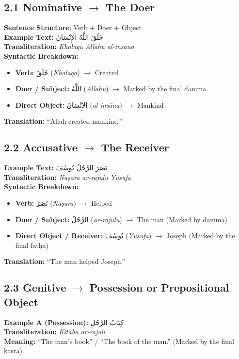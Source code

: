 \documentclass[11pt,a4paper]{article}
\begin{document}
\subsection{2.1 Nominative $\rightarrow$ The Doer}
\textbf{Sentence Structure:} Verb + Doer + Object \\
\textbf{Example Text:} \hfill {\Large \textarabic{خَلَقَ اللَّهُ الإِنْسَانَ}} \\
\textbf{Transliteration:} \textit{Khalaqa Allāhu al-insāna} \\
\textbf{Syntactic Breakdown:}
\begin{itemize}
    \item \textbf{Verb:} \textarabic{خَلَقَ} (\textit{Khalaqa}) $\rightarrow$ Created
    \item \textbf{Doer / Subject:} \textarabic{اللَّهُ} (\textit{Allāhu}) $\rightarrow$ Marked by the final ḍamma
    \item \textbf{Direct Object:} \textarabic{الإِنْسَانَ} (\textit{al-insāna}) $\rightarrow$ Mankind
\end{itemize}
\textbf{Translation:} ``Allah created mankind.''

\subsection{2.2 Accusative $\rightarrow$ The Receiver}
\textbf{Example Text:} \hfill {\Large \textarabic{نَصَرَ الرَّجُلُ يُوسُفَ}} \\
\textbf{Transliteration:} \textit{Naṣara ar-rajulu Yūsufa} \\
\textbf{Syntactic Breakdown:}
\begin{itemize}
    \item \textbf{Verb:} \textarabic{نَصَرَ} (\textit{Naṣara}) $\rightarrow$ Helped
    \item \textbf{Doer / Subject:} \textarabic{الرَّجُلُ} (\textit{ar-rajulu}) $\rightarrow$ The man (Marked by ḍamma)
    \item \textbf{Direct Object / Receiver:} \textarabic{يُوسُفَ} (\textit{Yūsufa}) $\rightarrow$ Joseph (Marked by the final fatḥa)
\end{itemize}
\textbf{Translation:} ``The man helped Joseph.''

\subsection{2.3 Genitive $\rightarrow$ Possession or Prepositional Object}
\textbf{Example A (Possession):} \hfill {\Large \textarabic{كِتَابُ الرَّجُلِ}} \\
\textbf{Transliteration:} \textit{Kitābu ar-rajuli} \\
\textbf{Meaning:} ``The man's book'' / ``The book of the man.'' (Marked by the final kasra)
\end{document}
